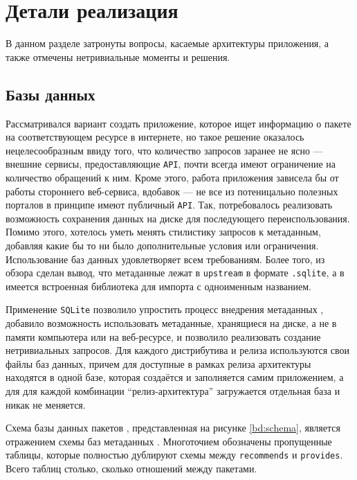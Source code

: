 
\section{Детали реализация}
В данном разделе затронуты вопросы, касаемые архитектуры приложения, а также отмечены нетривиальные моменты и решения.

\subsection{Базы данных}
Рассматривался вариант создать приложение, которое ищет информацию о пакете на соответствующем ресурсе в интернете, но такое решение оказалось нецелесообразным ввиду того, что количество запросов заранее не ясно --- внешние сервисы, предоставляющие \texttt{API}, почти всегда имеют ограничение на количество обращений к ним. Кроме этого, работа приложения зависела бы от работы стороннего веб-сервиса, вдобавок --- не все из потеницально полезных порталов в принципе имеют публичный \texttt{API}. Так, потребовалось реализовать возможность сохранения данных на диске для последующего переиспользования.
Помимо этого, хотелось уметь менять стилистику запросов к метаданным, добавляя какие бы то ни было дополнительные условия или ограничения. Использование баз данных удовлетворяет всем требованиям. Более того, из обзора сделан вывод, что метаданные {\fedora} лежат в \texttt{upstream} в формате \texttt{.sqlite}, а в {\python} имеется встроенная библиотека для импорта с одноименным названием.

Применение \texttt{SQLite} позволило упростить процесс внедрения метаданных {\fedora}, добавило возможность использовать метаданные, хранящиеся на диске, а не в памяти компьютера или на веб-ресурсе, и позволило реализовать создание нетривиальных запросов.
Для каждого дистрибутива и релиза используются свои файлы баз данных, причем для {\ubuntu} доступные в рамках релиза архитектуры находятся в одной базе, которая создаётся и заполняется самим приложением, а для {\fedora} для каждой комбинации \enquote{релиз-архитектура} загружается отдельная база и никак не меняется.

Схема базы данных пакетов {\ubuntu}, представленная на рисунке \ref{bd:schema}, является отражением схемы баз метаданных {\fedora}.
Многоточием обозначены пропущенные таблицы, которые полностью дублируют схемы между \texttt{recommends} и \texttt{provides}.
Всего таблиц столько, сколько отношений между пакетами.

